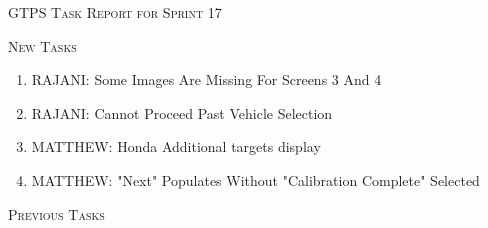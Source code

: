 


\begin{center}

\Large

\textsc{GTPS Task Report for Sprint 17}\

\normalsize \DTMnow

\end{center}\vspace{1.5cm}
\large

\textsc{{New Tasks}}

\normalsize
\begin{enumerate}[leftmargin=!,labelindent=5pt,itemindent=-35pt]
\item {} RAJANI: Some Images Are Missing For Screens 3 And 4
\item {} RAJANI: Cannot Proceed Past Vehicle Selection
\item {} MATTHEW: Honda Additional targets display
\item {} MATTHEW: "Next" Populates Without "Calibration Complete" Selected
\end{enumerate}\vspace{.5cm}
\large

\textsc{{Previous Tasks}}

